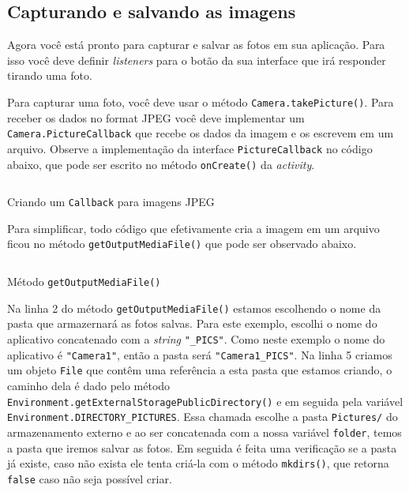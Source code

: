 \documentclass[a4paper,12pt,brazil]{book}
\begin{document}
\begin{singlespace}
	\newpage

	\subsection{Capturando e salvando as imagens}
		Agora você está pronto para capturar e salvar as fotos em sua aplicação. Para isso você deve definir \emph{listeners} para o botão da sua interface que irá responder tirando uma foto.


		Para capturar uma foto, você deve usar o método \texttt{Camera.takePicture()}. Para receber os dados no format JPEG você deve implementar um \texttt{Camera.PictureCallback} que recebe os dados da imagem e os escrevem em um arquivo. Observe a implementação da interface \texttt{PictureCallback} no código abaixo, que pode ser escrito no método \texttt{onCreate()} da \emph{activity}.

		\begin{listing}[H]
		\inputminted[linenos=true,fontsize=\small,frame=lines, framesep=2mm, tabsize=2,numbersep=5pt]{java}{src/api/camera/jpegcallback.java}
		\caption{Criando um \texttt{Callback} para imagens JPEG}
		\label{code:camera-jpegcallback}
		\end{listing} 			

		Para simplificar, todo código que efetivamente cria a imagem em um arquivo ficou no método \texttt{getOutputMediaFile()} que pode ser observado abaixo.

		\begin{listing}[H]
		\inputminted[linenos=true,fontsize=\small,frame=lines, framesep=2mm, tabsize=2,numbersep=5pt]{java}{src/api/camera/getoutputmediafile.java}
		\caption{Método \texttt{getOutputMediaFile()}}
		\label{code:camera-getoutput}
		\end{listing} 			

		Na linha 2 do método \texttt{getOutputMediaFile()} estamos escolhendo o nome da pasta que armazernará as fotos salvas. Para este exemplo, escolhi o nome do aplicativo concatenado com a \emph{string} \texttt{"\_PICS"}. Como neste exemplo o nome do aplicativo é \texttt{"Camera1"}, então a pasta será \texttt{"Camera1\_PICS"}. Na linha 5 criamos um objeto \texttt{File} que contêm uma referência a esta pasta que estamos criando, o caminho dela é dado pelo método \texttt{Environment.getExternalStoragePublicDirectory()} e em seguida pela variável \texttt{Environment.DIRECTORY\_PICTURES}. Essa chamada escolhe a pasta \texttt{Pictures/} do armazenamento externo e ao ser concatenada com a nossa variável \texttt{folder}, temos a pasta que iremos salvar as fotos. Em seguida é feita uma verificação se a pasta já existe, caso não exista ele tenta criá-la com o método \texttt{mkdirs()}, que retorna \texttt{false} caso não seja possível criar.


\end{singlespace}
\end{document}
